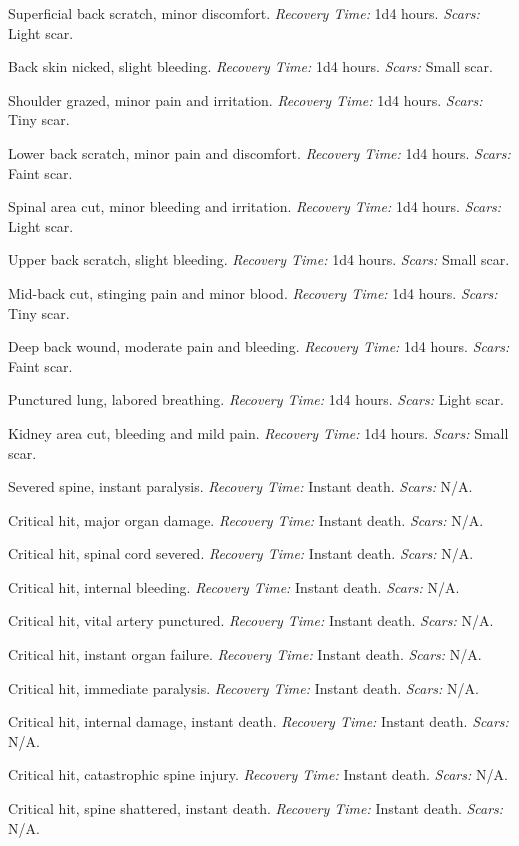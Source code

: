 \documentclass[12pt]{book}
\begin{document}
\begin{description}[labelwidth=1.5em, leftmargin=*, itemsep=0.4em]
    \item[1 -] Superficial back scratch, minor discomfort. \textit{Recovery Time:} 1d4 hours. \textit{Scars:} Light scar.
    \item[2 -] Back skin nicked, slight bleeding. \textit{Recovery Time:} 1d4 hours. \textit{Scars:} Small scar.
    \item[3 -] Shoulder grazed, minor pain and irritation. \textit{Recovery Time:} 1d4 hours. \textit{Scars:} Tiny scar.
    \item[4 -] Lower back scratch, minor pain and discomfort. \textit{Recovery Time:} 1d4 hours. \textit{Scars:} Faint scar.
    \item[5 -] Spinal area cut, minor bleeding and irritation. \textit{Recovery Time:} 1d4 hours. \textit{Scars:} Light scar.
    \item[6 -] Upper back scratch, slight bleeding. \textit{Recovery Time:} 1d4 hours. \textit{Scars:} Small scar.
    \item[7 -] Mid-back cut, stinging pain and minor blood. \textit{Recovery Time:} 1d4 hours. \textit{Scars:} Tiny scar.
    \item[8 -] Deep back wound, moderate pain and bleeding. \textit{Recovery Time:} 1d4 hours. \textit{Scars:} Faint scar.
    \item[9 -] Punctured lung, labored breathing. \textit{Recovery Time:} 1d4 hours. \textit{Scars:} Light scar.
    \item[10 -] Kidney area cut, bleeding and mild pain. \textit{Recovery Time:} 1d4 hours. \textit{Scars:} Small scar.
    \item[11 -] Severed spine, instant paralysis. \textit{Recovery Time:} Instant death. \textit{Scars:} N/A.
    \item[12 -] Critical hit, major organ damage. \textit{Recovery Time:} Instant death. \textit{Scars:} N/A.
    \item[13 -] Critical hit, spinal cord severed. \textit{Recovery Time:} Instant death. \textit{Scars:} N/A.
    \item[14 -] Critical hit, internal bleeding. \textit{Recovery Time:} Instant death. \textit{Scars:} N/A.
    \item[15 -] Critical hit, vital artery punctured. \textit{Recovery Time:} Instant death. \textit{Scars:} N/A.
    \item[16 -] Critical hit, instant organ failure. \textit{Recovery Time:} Instant death. \textit{Scars:} N/A.
    \item[17 -] Critical hit, immediate paralysis. \textit{Recovery Time:} Instant death. \textit{Scars:} N/A.
    \item[18 -] Critical hit, internal damage, instant death. \textit{Recovery Time:} Instant death. \textit{Scars:} N/A.
    \item[19 -] Critical hit, catastrophic spine injury. \textit{Recovery Time:} Instant death. \textit{Scars:} N/A.
    \item[20 -] Critical hit, spine shattered, instant death. \textit{Recovery Time:} Instant death. \textit{Scars:} N/A.
\end{description}
\end{document}
